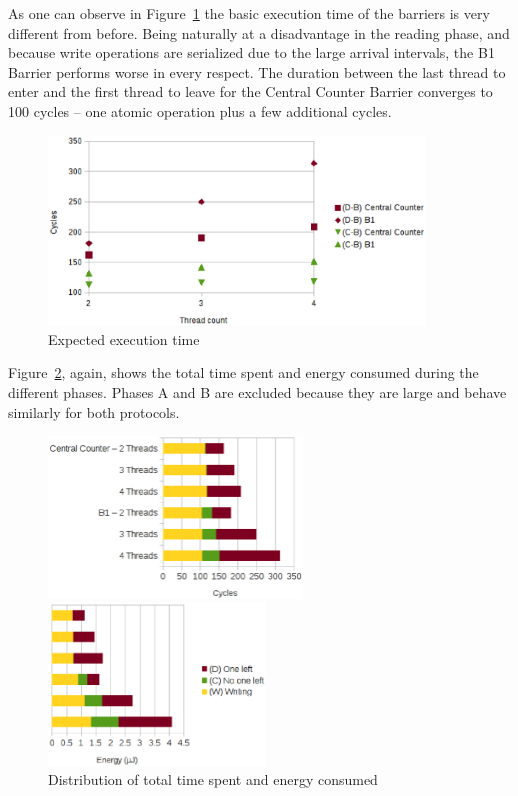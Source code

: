 \documentclass[a4paper, 10pt]{article}
\begin{document}
As one can observe in Figure~\ref{fig:c1-time-work-1000-B-C-D} the basic execution time of the barriers is very different from before.
Being naturally at a disadvantage in the reading phase, and because write operations are serialized due to the large arrival intervals, the B1 Barrier performs worse in every respect.
The duration between the last thread to enter and the first thread to leave for the Central Counter Barrier converges to 100 cycles -- one atomic operation plus a few additional cycles.
\begin{figure}[htbp]
	\centering
	\includegraphics[width=10cm]{charts/c1-time-work-1000-B-C-D}
	\caption{Expected execution time}
	\label{fig:c1-time-work-1000-B-C-D}
\end{figure}

Figure~\ref{fig:c1-work-1000-partition}, again, shows the total time spent and energy consumed during the different phases.
Phases A and B are excluded because they are large and behave similarly for both protocols.
\begin{figure}[htbp]
	\centering
	\begin{minipage}{0.53\linewidth}
		\includegraphics[height=4.3cm]{charts/c1-time-work-1000-partition}
	\end{minipage}
	\begin{minipage}{0.46\linewidth}
		\includegraphics[height=4.3cm]{charts/c1-energy-work-1000-partition}
	\end{minipage}
	\caption{Distribution of total time spent and energy consumed}
	\label{fig:c1-work-1000-partition}
\end{figure}
\end{document}
